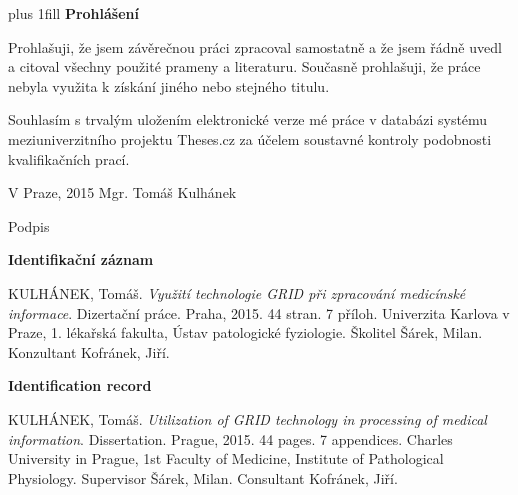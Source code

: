 
\newpage
\vglue 0pt plus 1fill
\noindent\Large \textbf{Prohlášení}

\normalsize
\noindent Prohlašuji, že jsem závěrečnou práci zpracoval samostatně a že jsem řádně uvedl a citoval všechny použité prameny a literaturu. Současně prohlašuji, že práce nebyla využita k získání jiného nebo stejného titulu.

\vspace{5mm}
\noindent Souhlasím s trvalým uložením elektronické verze mé práce v databázi systému meziuniverzitního projektu Theses.cz za účelem soustavné kontroly podobnosti kvalifikačních prací.


\vspace{15mm}

V Praze, 2015 \hfill          Mgr. Tomáš Kulhánek
\vspace{10mm}
					
\hfill Podpis

\vspace{20mm}

\newpage
\mbox{}
\newpage
\noindent\Large\textbf{Identifikační záznam}

\normalsize
\noindent
KULHÁNEK, Tomáš. \emph{Využití technologie GRID při zpracování medicínské informace}. Dizertační práce. Praha, 2015. 44 stran. 7 příloh. Univerzita Karlova v Praze, 1. lékařská fakulta, Ústav patologické fyziologie. Školitel Šárek, Milan. Konzultant Kofránek, Jiří.

\vspace{10mm}

\noindent\Large\textbf{Identification record}

\normalsize
\noindent
KULHÁNEK, Tomáš. \emph{Utilization of GRID technology in processing of medical information}. Dissertation. Prague, 2015. 44 pages. 7 appendices. Charles University in Prague, 1st Faculty of Medicine, Institute of Pathological Physiology. Supervisor Šárek, Milan. Consultant Kofránek, Jiří.

\newpage
\mbox{}


